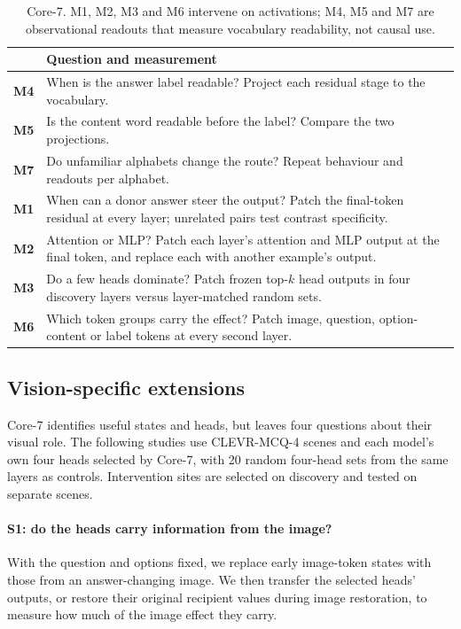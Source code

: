 \documentclass[11pt]{article}
\newcommand{\method}[1]{\textbf{M#1}}
\begin{document}
\begin{table}[t]
\centering
\footnotesize
\begin{tabularx}{\columnwidth}{@{}l X@{}}
\toprule
 & Question and measurement \\
\midrule
\method{4} & When is the answer label readable? Project each residual stage to the vocabulary. \\
\method{5} & Is the content word readable before the label? Compare the two projections. \\
\method{7} & Do unfamiliar alphabets change the route? Repeat behaviour and readouts per alphabet. \\
\method{1} & When can a donor answer steer the output? Patch the final-token residual at every layer; unrelated pairs test contrast specificity. \\
\method{2} & Attention or MLP? Patch each layer's attention and MLP output at the final token, and replace each with another example's output. \\
\method{3} & Do a few heads dominate? Patch frozen top-$k$ head outputs in four discovery layers versus layer-matched random sets. \\
\method{6} & Which token groups carry the effect? Patch image, question, option-content or label tokens at every second layer. \\
\bottomrule
\end{tabularx}
\caption{Core-7. M1, M2, M3 and M6 intervene on activations; M4, M5 and M7 are observational readouts that measure vocabulary readability, not causal use.}
\label{tab:core7}
\end{table}

\subsection{Vision-specific extensions}
\label{sec:extensions}

Core-7 identifies useful states and heads, but leaves four questions about their visual role. The following studies use CLEVR-MCQ-4 scenes and each model's own four heads selected by Core-7, with 20 random four-head sets from the same layers as controls. Intervention sites are selected on discovery and tested on separate scenes.

\paragraph{S1: do the heads carry information from the image?} With the question and options fixed, we replace early image-token states with those from an answer-changing image. We then transfer the selected heads' outputs, or restore their original recipient values during image restoration, to measure how much of the image effect they carry.
\end{document}
